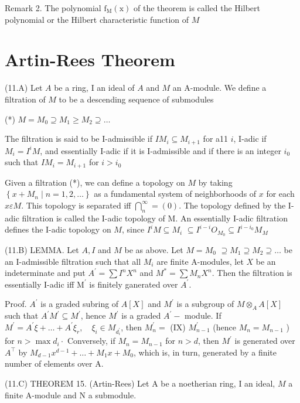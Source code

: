 Remark 2. The polynomial $\mathrm{f}_{\mathrm{M}}(\mathrm{x})$ of the theorem is called the Hilbert polynomial or the Hilbert characteristic function of $M$

\section{Artin-Rees Theorem}
(11.A) Let $A$ be a ring, I an ideal of $A$ and $M$ an A-module. We define a filtration of $M$ to be a descending sequence of submodules

(*) $M=M_{0} \supseteq M_{1} \geq M_{2} \supseteq \ldots$

The filtration is said to be I-admissible if $I M_{i} \subseteq M_{i+1}$ for a11 $i$, I-adic if $M_{i}=I^{i} M$, and essentially I-adic if it is I-admissible and if there is an integer $i_{0}$ such that $I M_{i}=M_{i+1}$ for $i>i_{0}$

Given a filtration (*), we can define a topology on $M$ by taking $\left\{x+M_{n} \mid n=1,2, \ldots\right\}$ as a fundamental system of neighborhoods of $x$ for each $x \varepsilon M$. This topology is separated iff $\bigcap_{n}^{\infty}=(0)$. The topology defined by the I-adic filtration is called the I-adic topology of M. An essentially I-adic filtration defines the I-adic topology on $M$, since $I^{i} M \subseteq M_{i}$ $\subseteq I^{i-i} O_{M_{0}} \subseteq I^{i-i_{0}} M_{M}$

(11.B) LEMMA. Let $A, I$ and $M$ be as above. Let $M=M_{0}$ $\supseteq M_{1} \supseteq M_{2} \supseteq \ldots$ be an I-admissible filtration such that all $M_{i}$ are finite A-modules, let $X$ be an indeterminate and put $A^{\prime}=\sum I^{n} X^{n}$ and $M^{*}=\sum M_{n} X^{n}$. Then the filtration is essentially I-adic iff $\mathrm{M}^{\prime}$ is finitely ganerated over $A^{\prime}$.

Proof. $A^{\prime}$ is a graded subring of $A[X]$ and $M^{\prime}$ is a subgroup of $M \otimes_{A} A[X]$ such that $A^{\prime} M^{\prime} \subseteq M^{\prime}$, hence $M^{\prime}$ is a graded $A^{\prime}-$ module. If $M^{\prime}=A^{\prime} \xi+\ldots+A^{\prime} \xi_{r}, \quad \xi_{i} \in M_{d_{i}^{\prime}}$, then $M_{n}^{\prime}=$ (IX) $M_{n-1}^{\prime}$ (hence $M_{n}=M_{n-1}$ ) for $n>\max d_{i} \cdot$ Conversely, if $M_{n}=M_{n-1}$ for $n>d$, then $M^{\prime}$ is generated over $A^{\top}$ by $M_{d-1} x^{d-1}+\ldots+M_{1} x+M_{0}$, which is, in turn, generated by a finite number of elements over A.

(11.C) THEOREM 15. (Artin-Rees) Let A be a noetherian ring, I an ideal, $M$ a finite A-module and $\mathrm{N}$ a submodule.

